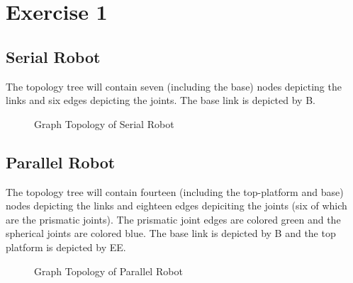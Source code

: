 \section{Exercise 1}
\subsection{Serial Robot}
The topology tree will contain seven (including the base) nodes depicting the links and six edges depicting the joints. The base link is depicted by B.
 \begin{figure}[h!]
 	\centering
 	
 	\caption{Graph Topology of Serial Robot}
 \end{figure}
\subsection{Parallel Robot}
The topology tree will contain fourteen (including the top-platform and base) nodes depicting the links and eighteen edges depiciting the joints (six of which are the prismatic joints). The prismatic joint edges are colored green and the spherical joints are colored blue. The base link is depicted by B and the top platform is depicted by EE.
 \begin{figure}[h!]
	\centering
	
	\caption{Graph Topology of Parallel Robot}
\end{figure}